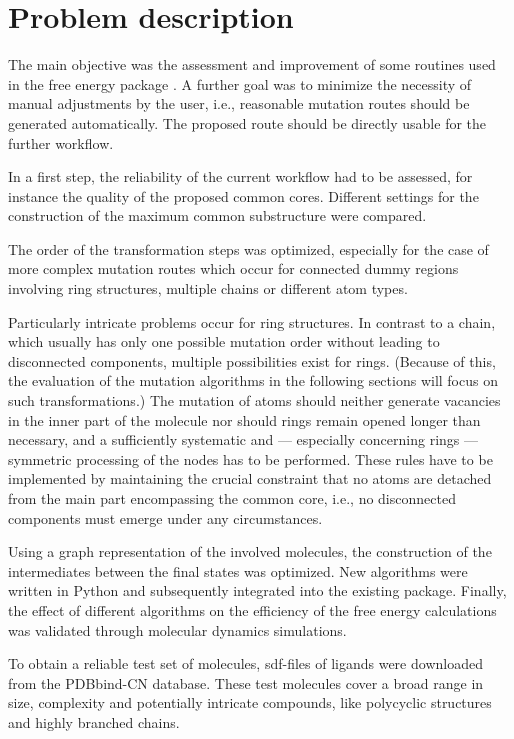 \chapter{Problem description }

The main objective was the assessment and improvement of some routines
used in the free energy package {\trafo}. A further goal was to
minimize the necessity of manual adjustments by the user, i.e.,
reasonable mutation routes should be generated automatically. The
proposed route should be directly usable for the further {\trafo}
workflow.

In a first step, the reliability of the current {\trafo} workflow
had to be assessed, for instance the quality of the proposed common
cores. Different settings for the construction of the maximum common
substructure were compared. 

The order of the transformation steps was optimized, especially
for the case of more complex mutation routes which occur for connected
dummy regions involving ring structures, multiple chains or different
atom types. 

Particularly intricate problems occur for ring structures. In contrast to a chain, which usually has only one possible mutation order without leading to disconnected components, multiple possibilities  exist for rings. (Because of this, the evaluation of the mutation algorithms in the following sections will focus on such transformations.) The mutation of atoms should neither generate vacancies in the inner part of the
molecule nor should rings remain opened longer than necessary, and
a sufficiently systematic and --- especially concerning rings --- symmetric
processing of the nodes has to be performed. These rules have to be
implemented by maintaining the crucial constraint that no atoms are
detached from the main part encompassing the common core, i.e., no
disconnected components must emerge under any circumstances.

Using a graph representation of the involved molecules, the construction
of the intermediates between the final states was optimized.
New algorithms were written in Python and subsequently integrated
into the existing {\trafo} package. Finally, the effect of different
algorithms on the efficiency of the free energy calculations was validated through molecular dynamics simulations. 

To obtain a reliable test set of molecules, sdf-files of ligands were downloaded from the PDBbind-CN database. These test molecules cover a
broad range in size, complexity and potentially intricate compounds,
like polycyclic structures and highly branched chains.

